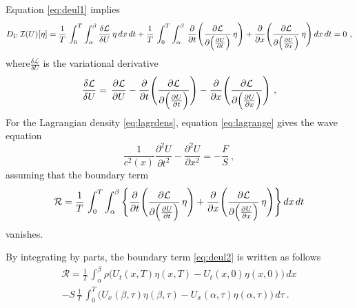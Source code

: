 \documentclass[twoside,11pt]{article}
\begin{document}
{Equation \eqref{eq:deul1} implies
\begin{equation}\label{eq:lagrange}
 {D_{U}\, \mathcal{I}(U)}[\eta]=\frac{1}{T} \,  \int_{0}^{T}\int_{\alpha}^{\beta} \frac{\delta {\mathcal L}}{\delta U}\, \eta \, dx \, dt
+ \frac{1}{T}\,\int_{0}^{T}\int_{\alpha}^{\beta} \, \frac{\partial}{\partial t} \Biggl(\frac{\partial {\mathcal L}}{\partial \Bigl(\frac{\partial U}{\partial t}\Bigr)} \, \eta \Biggr)+
\frac{\partial}{\partial x} \Biggl(\frac{\partial {\mathcal L}}{\partial \Bigl(\frac{\partial U}{\partial x}\Bigr)} \, \eta \Biggr) \, dx \, dt =0\ ,
\end{equation}
where$\frac{\delta {\mathcal L}}{\delta U}$ is the variational derivative
\begin{equation}\label{eq:varder}
\frac{\delta {\mathcal L}}{\delta U}= \, \frac{\partial {\mathcal L}}{\partial U}
-\frac{\partial }{\partial t}\Biggl(  \frac{\partial {\mathcal L}}{\partial \Bigl( \frac{\partial U}{\partial t}\Bigr)}  \Biggr) - \frac{\partial }{\partial x}\Biggl( \frac{\partial {\mathcal L}}{\partial
\Bigl(\frac{\partial U}{\partial x} \Bigr)} \Biggr) \ ,
\end{equation}
For the Lagrangian density \eqref{eq:lagrdens}, equation \eqref{eq:lagrange} gives the wave equation
\begin{equation}\label{eq:wave}
\frac{1}{c^2(x)} \frac{\partial^2 U}{\partial t^2}-\frac{\partial^2 U}{\partial x^2}= {- \frac{F}{S}} \ ,
\end{equation}
assuming that the boundary term
\begin{equation}\label{eq:deul2}
{\mathcal{R}}=\frac{1}{T}\,\int_{0}^{T}\int_{\alpha}^{\beta} \, \Biggl\{ \frac{\partial}{\partial t} \Biggl(\frac{\partial {\mathcal L}}{\partial \Bigl(\frac{\partial U}{\partial t}\Bigr)} \, \eta\Biggr)+
\frac{\partial}{\partial x} \Biggl(\frac{\partial {\mathcal L}}{\partial \Bigl(\frac{\partial U}{\partial x}\Bigr)} \, \eta \Biggr)\Biggr\}\, dx\, dt
\end{equation}
vanishes.

By integrating by parts, the boundary term \eqref{eq:deul2} is written as follows
\begin{eqnarray}\label{eq:remainder1}
{ \mathcal{R}}=\frac{1}{T}\, \int_{\alpha}^{\beta}\rho \Biggl( U_t(x,T)\eta(x,T)-U_t(x,0) \eta(x,0)\Biggr) \, dx \nonumber \\
-S\, \frac{1}{T}\,\int_{0}^{T}\Biggl(U_x(\beta, \tau)\eta(\beta, \tau)-U_x(\alpha, \tau)\eta(\alpha, \tau)\Biggr)\, d\tau  \ .
\end{eqnarray}

}
\end{document}
